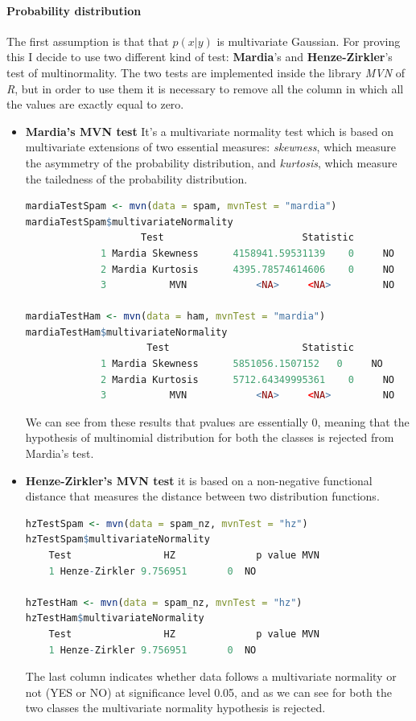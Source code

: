 \documentclass[11pt,a4paper]{article}
\begin{document}
\paragraph{Probability distribution} The first assumption is that that $p(x|y)$ is multivariate Gaussian. For proving this I decide to use two different kind of test: \textbf{Mardia}'s and \textbf{Henze-Zirkler}’s test of multinormality. The two tests are implemented inside the library \textit{MVN} of \textit{R}, but in order to use them it is necessary to remove all the column in which all the values are exactly equal to zero. 
\newpage
\begin{itemize}
	\item \textbf{Mardia’s MVN test} It’s a multivariate normality test which is based on multivariate extensions of two essential measures: \textit{skewness}, which measure the asymmetry of the probability distribution, and \textit{kurtosis}, which measure the tailedness of the probability distribution.\\
\begin{lstlisting}[language=R]
mardiaTestSpam <- mvn(data = spam, mvnTest = "mardia")
mardiaTestSpam$multivariateNormality
					Test     					Statistic 			p value Result
			 1 Mardia Skewness 		4158941.59531139    0     NO
			 2 Mardia Kurtosis 		4395.78574614606    0     NO
			 3           MVN       		<NA>     <NA>         NO
             
mardiaTestHam <- mvn(data = ham, mvnTest = "mardia")
mardiaTestHam$multivariateNormality
					 Test     					Statistic 			p value Result
			 1 Mardia Skewness 	   	5851056.1507152   0     NO
			 2 Mardia Kurtosis 		5712.64349995361    0     NO
			 3           MVN       		<NA>     <NA>         NO
\end{lstlisting}
We can see from these results that pvalues are essentially 0, meaning that the hypothesis of multinomial distribution for both the classes is rejected from Mardia's test.


	\item \textbf{Henze-Zirkler’s MVN test} it is based on a non-negative functional distance that measures the
	distance between two distribution functions.
	
\begin{lstlisting}[language=R]
hzTestSpam <- mvn(data = spam_nz, mvnTest = "hz")
hzTestSpam$multivariateNormality
	Test       			HZ 				p value MVN
	1 Henze-Zirkler 9.756951       0  NO

hzTestHam <- mvn(data = spam_nz, mvnTest = "hz")
hzTestHam$multivariateNormality
	Test      			HZ 				p value MVN
	1 Henze-Zirkler 9.756951       0  NO
\end{lstlisting}
The last column indicates whether data follows a multivariate normality or not (YES or NO) at significance level 0.05, and as we can see for both the two classes the multivariate normality hypothesis is rejected.
\end{itemize}
\end{document}
